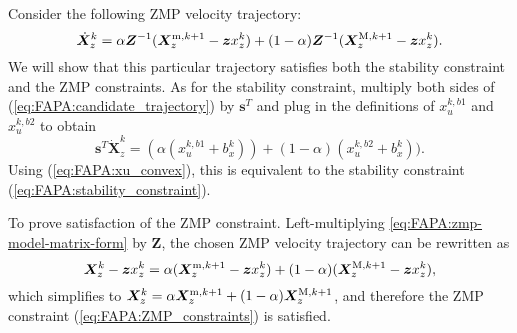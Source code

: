 Consider the following ZMP velocity trajectory:
\begin{equation}\label{eq:FAPA:candidate_trajectory}
\dot{\bm{X}}_z^k = \alpha \bm{Z}^{-1}(\bm{X}_z^{{\rm m}, k+1} - \bm{z} x_z^k) + (1-\alpha)\bm{Z}^{-1}(\bm{X}_z^{{\rm M}, k+1} - \bm{z} x_z^k).
\end{equation}
We will show that this particular trajectory satisfies both the stability constraint and the ZMP constraints. As for the stability constraint, multiply both sides of (\ref{eq:FAPA:candidate_trajectory}) by $\bm{s}^T$
and plug in the definitions of $x_u^{k,b1}$ and $x_u^{k,b2}$ to obtain
\begin{equation*}
\bm{s}^T\dot{\bm X}_z^k = (\alpha (x_u^{k,b1} + b^k_x)) + (1-\alpha)(x_u^{k,b2} + b^k_x)).
\end{equation*}
Using (\ref{eq:FAPA:xu_convex}), this is equivalent to the stability constraint (\ref{eq:FAPA:stability_constraint}).

To prove satisfaction of the ZMP constraint. Left-multiplying \eqref{eq:FAPA:zmp-model-matrix-form} by $\bm{Z}$, the chosen ZMP velocity trajectory can be rewritten as
\begin{equation*}
\bm{X}_z^k - \bm{z} x_z^k = \alpha (\bm{X}_z^{{\rm m}, k+1} - \bm{z} x_z^k) + (1-\alpha)(\bm{X}_z^{{\rm M}, k+1} - \bm{z} x_z^k),
\end{equation*}
which simplifies to
$\bm{X}_z^k = \alpha \bm{X}_z^{{\rm m}, k+1} + (1-\alpha)\bm{X}_z^{{\rm M}, k+1}$,
and therefore the ZMP constraint (\ref{eq:FAPA:ZMP_constraints}) is satisfied. \hfill\bull
